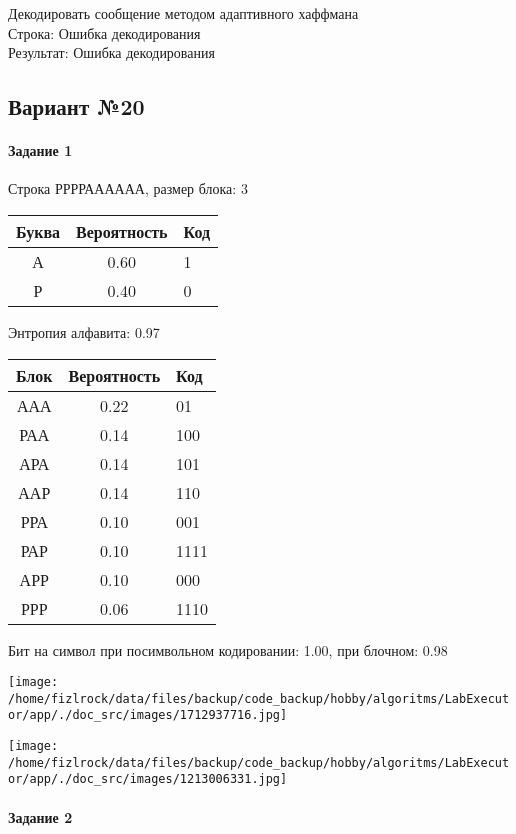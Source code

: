\documentclass[a4paper, 12pt]{article}
\begin{document}
Декодировать сообщение методом адаптивного хаффмана \\
Строка: 
Ошибка декодирования\\
Результат: Ошибка декодирования
\pagebreak
\subsection{Вариант №20}
\paragraph{Задание 1}

Строка РРРРАААААА, размер блока: 3
\begin{center}
 \begin{tabular}{ |c|c|l| } 
  \hline
     Буква & Вероятность & Код\\ \hline
А & 0.60 & 1\\\hline
Р & 0.40 & 0
\\ \hline \end{tabular}
\end{center}
Энтропия алфавита: 0.97
\begin{center}
 \begin{tabular}{ |c|c|l| } 
  \hline
     Блок & Вероятность & Код\\ \hline
ААА & 0.22 & 01\\\hline
РАА & 0.14 & 100\\\hline
АРА & 0.14 & 101\\\hline
ААР & 0.14 & 110\\\hline
РРА & 0.10 & 001\\\hline
РАР & 0.10 & 1111\\\hline
АРР & 0.10 & 000\\\hline
РРР & 0.06 & 1110
\\ \hline \end{tabular}
\end{center}
Бит на символ при посимвольном кодировании: 1.00, при блочном: 0.98

\texttt{[image: /home/fizlrock/data/files/backup/code\_backup/hobby/algoritms/LabExecutor/app/./doc\_src/images/1712937716.jpg]}

\texttt{[image: /home/fizlrock/data/files/backup/code\_backup/hobby/algoritms/LabExecutor/app/./doc\_src/images/1213006331.jpg]}
\pagebreak
\paragraph{Задание 2}
\end{document}
